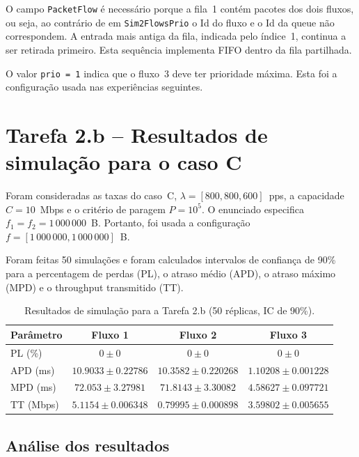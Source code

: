 \documentclass[11pt,a4paper]{article}
\begin{document}
O campo \texttt{PacketFlow} é necessário
porque a fila~1 contém pacotes dos dois fluxos, ou seja, ao contrário de em \texttt{Sim2FlowsPrio} o Id do fluxo e o Id da queue não correspondem. A entrada mais antiga
da fila, indicada pelo índice~1, continua a ser retirada primeiro. Esta
sequência implementa FIFO dentro da fila partilhada.

O valor \texttt{prio = 1} indica que o fluxo~3 deve ter prioridade máxima.
Esta foi a configuração usada nas experiências seguintes.

\newpage

\section{Tarefa 2.b -- Resultados de simulação para o caso C}

Foram consideradas as taxas do caso~C,
$\lambda=[800,800,600]$~pps, a capacidade $C=10$~Mbps e o critério de
paragem $P=10^5$. O enunciado especifica
$f_1=f_2=1\,000\,000$~B. Portanto, foi usada a configuração
$f=[1\,000\,000,1\,000\,000]$~B.

Foram feitas 50 simulações e foram calculados intervalos de confiança de 90\%
para a percentagem de perdas (PL), o atraso médio (APD), o atraso máximo (MPD)
e o throughput transmitido (TT).

\begin{table}[htbp]
    \centering
    \caption{Resultados de simulação para a Tarefa 2.b (50 réplicas, IC de 90\%).}
    \label{tab:2b}
    \begin{tabular}{lccc}
        \toprule
        Parâmetro & Fluxo 1 & Fluxo 2 & Fluxo 3 \\
        \midrule
        PL (\%)   & $0 \pm 0$ & $0 \pm 0$ & $0 \pm 0$ \\
        APD (ms)  & $10.9033 \pm 0.22786$ &
                     $10.3582 \pm 0.220268$ &
                     $1.10208 \pm 0.001228$ \\
        MPD (ms)  & $72.053 \pm 3.27981$ &
                     $71.8143 \pm 3.30082$ &
                     $4.58627 \pm 0.097721$ \\
        TT (Mbps) & $5.1154 \pm 0.006348$ &
                     $0.79995 \pm 0.000898$ &
                     $3.59802 \pm 0.005655$ \\
        \bottomrule
    \end{tabular}
\end{table}

\subsection*{Análise dos resultados}
\end{document}
